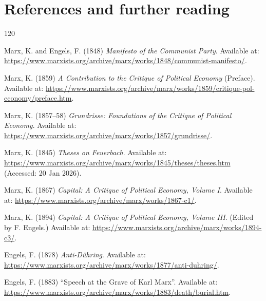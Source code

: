 
\section*{References and further reading}

\begin{singlespace}

\begin{thebibliography}{120}
\setlength{\itemsep}{0.35em}
\setlength{\parsep}{0pt}


Marx, K. and Engels, F. (1848) \emph{Manifesto of the Communist Party}.
Available at: \url{https://www.marxists.org/archive/marx/works/1848/communist-manifesto/}.

Marx, K. (1859) \emph{A Contribution to the Critique of Political Economy} (Preface).
Available at: \url{https://www.marxists.org/archive/marx/works/1859/critique-pol-economy/preface.htm}.

Marx, K. (1857--58) \emph{Grundrisse: Foundations of the Critique of Political Economy}.
Available at: \url{https://www.marxists.org/archive/marx/works/1857/grundrisse/}.

Marx, K. (1845) \emph{Theses on Feuerbach}.
Available at: \url{https://www.marxists.org/archive/marx/works/1845/theses/theses.htm}
(Accessed: 20 Jan 2026).

Marx, K. (1867) \emph{Capital: A Critique of Political Economy, Volume I}.
Available at: \url{https://www.marxists.org/archive/marx/works/1867-c1/}.

Marx, K. (1894) \emph{Capital: A Critique of Political Economy, Volume III}.
(Edited by F. Engels.)
Available at: \url{https://www.marxists.org/archive/marx/works/1894-c3/}.

Engels, F. (1878) \emph{Anti-D\"uhring}.
Available at: \url{https://www.marxists.org/archive/marx/works/1877/anti-duhring/}.

Engels, F. (1883) ``Speech at the Grave of Karl Marx''.
Available at: \url{https://www.marxists.org/archive/marx/works/1883/death/burial.htm}.


\end{thebibliography}
\end{singlespace}
